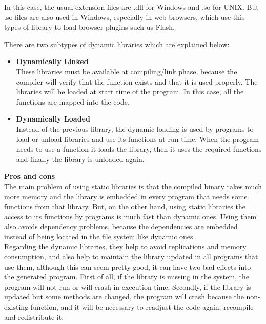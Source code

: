 \begin{itemize}
In this case, the usual extension files are .dll for Windows and .so for UNIX. But .so files are also used in Windows, especially in web browsers, which use this types of library to load browser plugins such us Flash.

There are two subtypes of dynamic libraries which are explained below:
  \begin{itemize}
    \item 
    \textbf{Dynamically Linked}
  	\\
  	These libraries must be available at compiling/link phase, because the compiler will verify that the function exists and that it is used properly. The libraries will be loaded at start time of the program. In this case, all the functions are mapped into the code.
    \item
    \textbf{Dynamically Loaded}
    \\
    Instead of the previous library, the dynamic loading is used by programs to load or unload libraries and use its functions at run time. When the program needs to use a function it loads the library, then it uses the required functions and finally the library is unloaded again.
    \end{itemize}
\end{itemize}

\textbf{Pros and cons}
\\
The main problem of using static libraries is that the compiled binary takes much more memory and the library is embedded in every program that needs some functions from that library. But, on the other hand, using static libraries the access to its functions by programs is much fast than dynamic ones. Using them also avoids dependency problems, because the dependencies are embedded instead of being located in the file system like dynamic ones.
\\
Regarding the dynamic libraries, they help to avoid replications and memory consumption, and also help to maintain the library updated in all programs that use them, although this can seem pretty good, it can have two bad effects into the generated program. First of all, if the library is missing in the system, the program will not run or will crash in execution time. Secondly, if the library is updated but some methods are changed, the program will crash because the non-existing function, and it will be necessary to readjust the code again, recompile and redistribute it.

